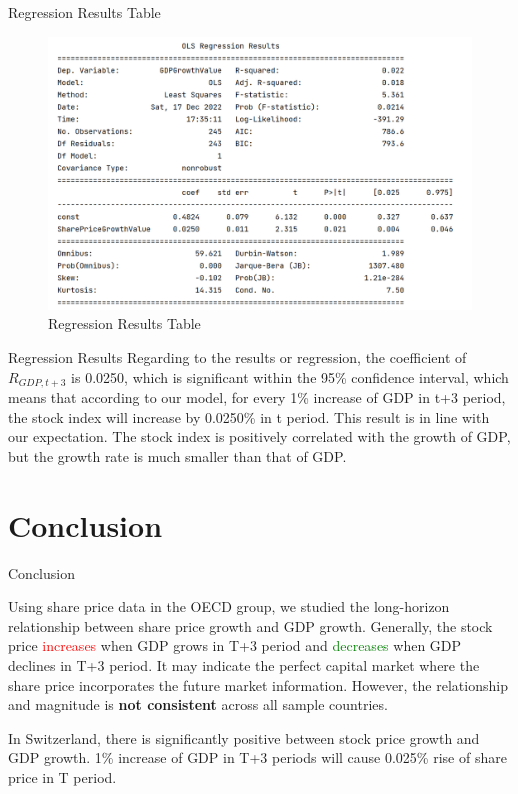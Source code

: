 \documentclass[10pt]{beamer}
\begin{document}
\begin{frame}{Regression Results Table}

    \begin{figure}[htp]
    \centering
    \includegraphics[scale=0.5]{"reg"}
    \caption{Regression Results Table}
    \label{regression table}
    \end{figure}
\end{frame}

\begin{frame}{Regression Results}
    Regarding to the results or regression\hyperlink{regression table}{}, the coefficient of $R_{GDP,t+3}$ is 0.0250, which is significant within the 95\% confidence interval, which means that according to our model, for every 1\% increase of GDP in t+3 period, the stock index will increase by 0.0250\% in t period. This result is in line with our expectation. The stock index is positively correlated with the growth of GDP, but the growth rate is much smaller than that of GDP.
\end{frame}


\section{Conclusion}

\begin{frame}{Conclusion}

Using share price data in the OECD group, we studied the long-horizon relationship between share price growth and GDP growth. Generally, the stock price \textcolor{red}{increases} when GDP grows in T+3 period and \textcolor{green}{decreases} when GDP declines in T+3 period. It may indicate the perfect capital market where the share price incorporates the future market information. However, the relationship and magnitude is \textbf{not consistent} across all sample countries. 

In Switzerland, there is significantly positive between stock price growth and GDP growth. 1\% increase of GDP in T+3 periods will cause 0.025\% rise of share price in T period.

\end{frame}
\end{document}
